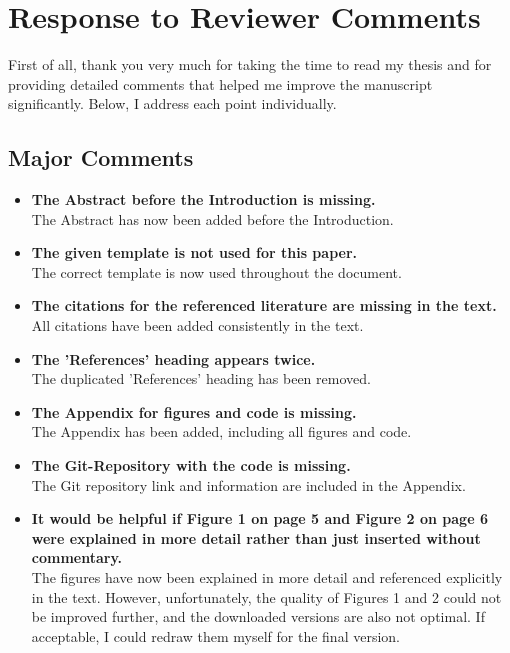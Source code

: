 \documentclass[aodsor,preprint]{imsart}
\numberwithin{equation}{section}
\theoremstyle{plain}
\begin{document}
\section*{Response to Reviewer Comments}

First of all, thank you very much for taking the time to read my thesis and for providing detailed comments that helped me improve the manuscript significantly. Below, I address each point individually.

\subsection*{Major Comments}

\begin{itemize}
    \item \textbf{The Abstract before the Introduction is missing.}\\
    The Abstract has now been added before the Introduction.
    
    \item \textbf{The given template is not used for this paper.}\\
    The correct template is now used throughout the document.
    
    \item \textbf{The citations for the referenced literature are missing in the text.}\\
    All citations have been added consistently in the text.
    
    \item \textbf{The 'References' heading appears twice.}\\
    The duplicated 'References' heading has been removed.
    
    \item \textbf{The Appendix for figures and code is missing.}\\
    The Appendix has been added, including all figures and code.
    
    \item \textbf{The Git-Repository with the code is missing.}\\
    The Git repository link and information are included in the Appendix.
    
    \item \textbf{It would be helpful if Figure 1 on page 5 and Figure 2 on page 6 were explained in more detail rather than just inserted without commentary.}\\
    The figures have now been explained in more detail and referenced explicitly in the text. However, unfortunately, the quality of Figures 1 and 2 could not be improved further, and the downloaded versions are also not optimal. If acceptable, I could redraw them myself for the final version.
    

\end{itemize}
\end{document}

